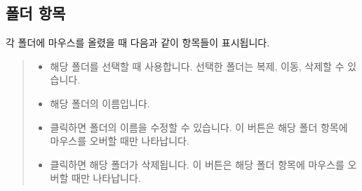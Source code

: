 \documentclass[letterpaper,10pt,english]{sphinxmanual}
\begin{document}
\subsection{폴더 항목}
\label{\detokenize{discovery/part03/workspace_management:folders}}\label{\detokenize{discovery/part03/workspace_management:id3}}
각 폴더에 마우스를 올렸을 때 다음과 같이 항목들이 표시됩니다.
\begin{quote}

\begin{figure}[H]
\centering

\noindent{}
\end{figure}
\begin{itemize}
\item {} 
 해당 폴더를 선택할 때 사용합니다. 선택한 폴더는 복제, 이동, 삭제할 수 있습니다.

\item {} 
 해당 폴더의 이름입니다.

\item {} 
 클릭하면 폴더의 이름을 수정할 수 있습니다. 이 버튼은 해당 폴더 항목에 마우스를 오버할 때만 나타납니다.

\item {} 
 클릭하면 해당 폴더가 삭제됩니다. 이 버튼은 해당 폴더 항목에 마우스를 오버할 때만 나타납니다.

\end{itemize}
\end{quote}
\end{document}
